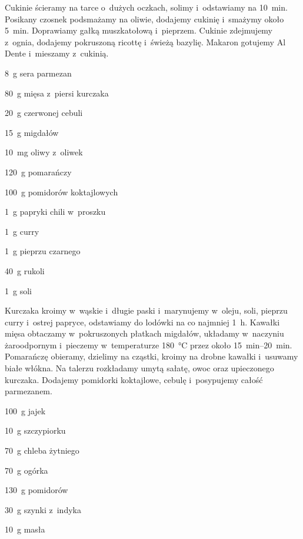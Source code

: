 \documentclass[../kucharek.tex]{subfiles}
\begin{document}
Cukinie ścieramy na tarce o~dużych oczkach, solimy i~odstawiamy na
\qty{10}{\minute}. Posikany czosnek podsmażamy na oliwie, dodajemy cukinię
i~smażymy około \qty{5}{\minute}. Doprawiamy gałką muszkatołową i~pieprzem.
Cukinie zdejmujemy z~ognia, dodajemy pokruszoną ricottę i~świeżą bazylię.
Makaron gotujemy Al Dente i~mieszamy z~cukinią.


\begin{Ingred}
    \item \qty{8}{\gram} sera parmezan
    \item \qty{80}{\gram} mięsa z~piersi kurczaka
    \item \qty{20}{\gram} czerwonej cebuli
    \item \qty{15}{\gram} migdałów
    \item \qty{10}{\milli\gram} oliwy z~oliwek
    \item \qty{120}{\gram} pomarańczy
    \item \qty{100}{\gram} pomidorów koktajlowych
    \item \qty{1}{\gram} papryki chili w~proszku
    \item \qty{1}{\gram} curry
    \item \qty{1}{\gram} pieprzu czarnego
    \item \qty{40}{\gram} rukoli
    \item \qty{1}{\gram} soli
\end{Ingred}

Kurczaka kroimy w~wąskie i~długie paski i~marynujemy w~oleju, soli, pieprzu
curry i~ostrej papryce, odstawiamy do lodówki na co najmniej \qty{1}{\hour}.
Kawałki mięsa obtaczamy w~pokruszonych płatkach migdałów, układamy w~naczyniu
żaroodpornym i~pieczemy w~temperaturze \qty{180}{\celsius} przez około
\qtyrange{15}{20}{\minute}. Pomarańczę obieramy, dzielimy na cząstki, kroimy na
drobne kawałki i~usuwamy białe włókna. Na talerzu rozkładamy umytą sałatę, owoc
oraz upieczonego kurczaka. Dodajemy pomidorki koktajlowe, cebulę i~posypujemy
całość parmezanem.


\begin{Ingred}
    \item \qty{100}{\gram} jajek
    \item \qty{10}{\gram} szczypiorku
    \item \qty{70}{\gram} chleba żytniego
    \item \qty{70}{\gram} ogórka
    \item \qty{130}{\gram} pomidorów
    \item \qty{30}{\gram} szynki z~indyka
    \item \qty{10}{\gram} masła
\end{Ingred}
\end{document}

